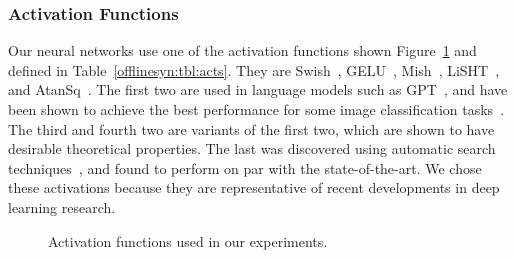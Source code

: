 \subsubsection{Activation Functions}
Our neural networks use one of the activation functions shown
Figure~\ref{offlinesyn:fig:acts} and defined in Table~\ref{offlinesyn:tbl:acts}.
They are
Swish~\cite{hendrycks2016gaussian,ramachandran2017searching},
GELU~\cite{hendrycks2016gaussian}, Mish~\cite{misra2019mish},
LiSHT~\cite{roy2019lisht}, and AtanSq~\cite{ramachandran2017searching}. The
first two are used in language models such as
GPT~\cite{radford2018improving}, and have been shown to achieve
the best performance for some image classification
tasks~\cite{ramachandran2017searching}. The third and fourth two are variants
of the first two, which are shown to have desirable theoretical properties. The
last was discovered using automatic search
techniques~\cite{ramachandran2017searching}, and found to perform on par with
the state-of-the-art. We chose these activations because they are representative of
recent developments in deep learning research.

\begin{figure}[t]
	\centering
	\begin{minipage}{.48\textwidth}
		\centering
		\begin{table}[H]
			\caption{Definitions of activation functions used in our experiments.}
			\label{offlinesyn:tbl:acts}
		\end{table}
	\end{minipage}\hspace{12pt}%
	\begin{minipage}{.48\textwidth}
		\centering
		\scalebox{1.1}{
			}
		\caption{Activation functions used in our experiments.}
		\label{offlinesyn:fig:acts}
	\end{minipage}
\end{figure}

